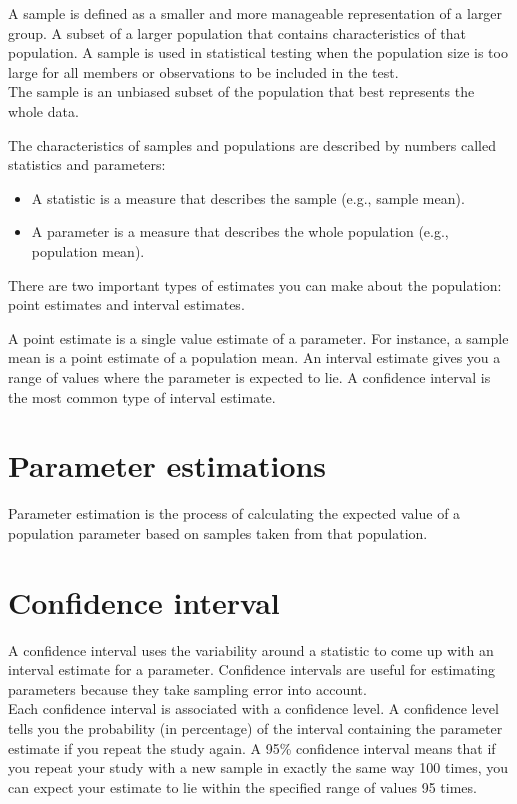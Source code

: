 \documentclass[
]{book}
\providecommand{\tightlist}{%
  \setlength{\itemsep}{0pt}\setlength{\parskip}{0pt}}
\begin{document}
A sample is defined as a smaller and more manageable representation of a larger group. A subset of a larger population that contains characteristics of that population. A sample is used in statistical testing when the population size is too large for all members or observations to be included in the test.\\
The sample is an unbiased subset of the population that best represents the whole data.

The characteristics of samples and populations are described by numbers called statistics and parameters:

\begin{itemize}
\tightlist
\item
  A statistic is a measure that describes the sample (e.g., sample mean).
\item
  A parameter is a measure that describes the whole population (e.g., population mean).
\end{itemize}

There are two important types of estimates you can make about the population: point estimates and interval estimates.

A point estimate is a single value estimate of a parameter. For instance, a sample mean is a point estimate of a population mean.
An interval estimate gives you a range of values where the parameter is expected to lie. A confidence interval is the most common type of interval estimate.

\hypertarget{parameter-estimations}{%
\section{Parameter estimations}\label{parameter-estimations}}

Parameter estimation is the process of calculating the expected value of a population parameter based on samples taken from that population.

\hypertarget{confidence-interval}{%
\section{Confidence interval}\label{confidence-interval}}

A confidence interval uses the variability around a statistic to come up with an interval estimate for a parameter. Confidence intervals are useful for estimating parameters because they take sampling error into account.\\
Each confidence interval is associated with a confidence level. A confidence level tells you the probability (in percentage) of the interval containing the parameter estimate if you repeat the study again.
A 95\% confidence interval means that if you repeat your study with a new sample in exactly the same way 100 times, you can expect your estimate to lie within the specified range of values 95 times.
\end{document}
